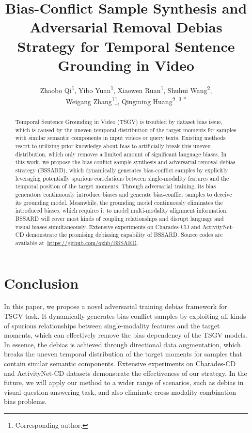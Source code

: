 \documentclass[letterpaper]{article} %
\title{Bias-Conflict Sample Synthesis and Adversarial Removal Debias Strategy for Temporal Sentence Grounding in Video}
\author{
	Zhaobo Qi\textsuperscript{\rm 1}, 
	Yibo Yuan\textsuperscript{\rm 1}, 
	Xiaowen Ruan\textsuperscript{\rm 1}, 
	Shuhui Wang\textsuperscript{\rm 2}, \\
	Weigang Zhang\textsuperscript{\rm 1}\thanks{Corresponding author.}, 
	Qingming Huang\textsuperscript{\rm 2, \rm 3 *}
}
\begin{document}
\maketitle

\begin{abstract}
	Temporal Sentence Grounding in Video (TSGV) is troubled by dataset bias issue, which is caused by the uneven temporal distribution of the target moments for samples with similar semantic components in input videos or query texts. Existing methods resort to utilizing prior knowledge about bias to artificially break this uneven distribution, which only removes a limited amount of significant language biases. In this work, we propose the bias-conflict sample synthesis and adversarial removal debias strategy (BSSARD), which dynamically generates bias-conflict samples by explicitly leveraging potentially spurious correlations between single-modality features and the temporal position of the target moments. Through adversarial training, its bias generators continuously introduce biases and generate bias-conflict samples to deceive its grounding model. Meanwhile, the grounding model continuously eliminates the introduced biases, which requires it to model multi-modality alignment information. BSSARD will cover most kinds of coupling relationships and disrupt language and visual biases simultaneously. Extensive experiments on Charades-CD and ActivityNet-CD demonstrate the promising debiasing capability of BSSARD. Source codes are available at~\url{https://github.com/qzhb/BSSARD}.
\end{abstract}













\section{Conclusion}
In this paper, we propose a novel adversarial training debias framework for TSGV task. 
It dynamically generates bias-conflict samples by exploiting all kinds of spurious relationships between single-modality features and the target moments, which can effectively remove the bias dependency of the TSGV models. 
In essence, the debias is achieved through directional data augmentation, which breaks the uneven temporal distribution of the target moments for samples that contain similar semantic components.  
Extensive experiments on Charades-CD and ActivityNet-CD datasets demonstrate the effectiveness of our strategy. 
In the future, we will apply our method to a wider range of scenarios, such as debias in visual question-answering task, and also eliminate cross-modality combination bias problems.
\end{document}
